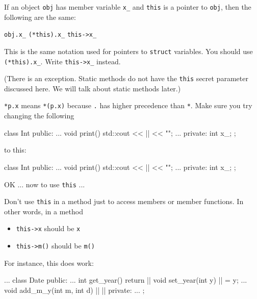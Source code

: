 
If an object \texttt{obj} has member variable \texttt{x\_} and \texttt{this}
is a pointer to \texttt{obj}, then the following are the same:

\texttt{obj.x\_} \hspace{1cm} \texttt{(*this).x\_} \hspace{1cm} \texttt{this->x\_}

This is the same notation used for pointers to \texttt{struct} variables.
You should  use \texttt{(*this).x\_}. Write
\texttt{this->x\_} instead.

(There is an exception. Static methods do not have the \texttt{this}
secret parameter discussed here. We will talk about static methods
later.)

 \texttt{*p.x} means \texttt{*(p.x)} because \texttt{.} has
higher precedence than \texttt{*}. Make sure you try changing the
following

\begin{consolethree}[escapeinside=||]
class Int
{
public:
    ...
    void print()
    {
        std::cout << || << "\n";
    }
    ...
private:
    int x_;
};
\end{consolethree}
to this:

\begin{consolethree}[escapeinside=||]
class Int
{
public:
    ...
    void print()
    {
        std::cout << || << "\n";
    }
    ...
private:
    int x_;
};
\end{consolethree}
OK ... now to use \texttt{this} ...


\newpage{}

 Don't use \texttt{this} in a method just to access members or member functions. In other words, in a method

\begin{itemize}
\item \texttt{this->x} should be \texttt{x}
\item \texttt{this->m()} should be \texttt{m()}
\end{itemize}

For instance, this does work:

\begin{consolethree}[escapeinside=||]
...
class Date
{
public:
    ...
    int get_year()
    {
        return ||
    }
    void set_year(int y)
    {
        || = y;
    }
    ...
    void add_m_y(int m, int d)
    {
        ||
        ||
    }
private:
    ...
};
\end{consolethree}

